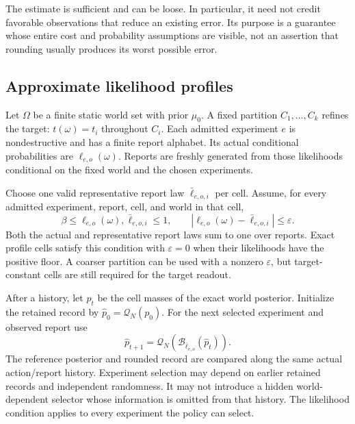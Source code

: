 The estimate is sufficient and can be loose. In particular, it need not credit favorable observations that reduce an existing error. Its purpose is a guarantee whose entire cost and probability assumptions are visible, not an assertion that rounding usually produces its worst possible error.

\subsection{Approximate likelihood profiles}
Let $\Omega$ be a finite static world set with prior $\mu_0$. A fixed partition $C_1,\ldots,C_k$ refines the target: $t(\omega)=t_i$ throughout $C_i$. Each admitted experiment $e$ is nondestructive and has a finite report alphabet. Its actual conditional probabilities are $\ell_{e,o}(\omega)$. Reports are freshly generated from those likelihoods conditional on the fixed world and the chosen experiments.

Choose one valid representative report law $\bar\ell_{e,o,i}$ per cell. Assume, for every admitted experiment, report, cell, and world in that cell,
\[
 \beta\le \ell_{e,o}(\omega),\bar\ell_{e,o,i}\le1,
 \qquad |\ell_{e,o}(\omega)-\bar\ell_{e,o,i}|\le\varepsilon. \tag{10}
\]
Both the actual and representative report laws sum to one over reports. Exact profile cells satisfy this condition with $\varepsilon=0$ when their likelihoods have the positive floor. A coarser partition can be used with a nonzero $\varepsilon$, but target-constant cells are still required for the target readout.

After a history, let $p_t$ be the cell masses of the exact world posterior. Initialize the retained record by $\widehat p_0=\mathcal Q_N(p_0)$. For the next selected experiment and observed report use
\[
 \widehat p_{t+1}=\mathcal Q_N\!\left(\mathcal B_{\bar\ell_{e,o}}(\widehat p_t)\right).
\]
The reference posterior and rounded record are compared along the same actual action/report history. Experiment selection may depend on earlier retained records and independent randomness. It may not introduce a hidden world-dependent selector whose information is omitted from that history. The likelihood condition applies to every experiment the policy can select.

